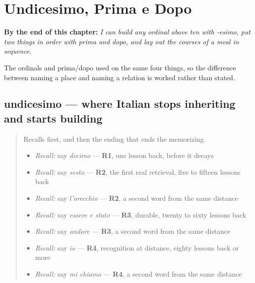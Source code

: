 
\chapter{Undicesimo, Prima e Dopo}
\label{ch:it-ordinali-esimo}

\begin{chapteropening}
\textbf{By the end of this chapter:} \emph{I can build any ordinal above ten with -esimo, put two things in order with prima and dopo, and lay out the courses of a meal in sequence.}

The ordinals and prima/dopo used on the same four things, so the difference between naming a place and naming a relation is worked rather than stated.
\end{chapteropening}

\section[undicesimo]{undicesimo — where Italian stops inheriting and starts building}

\label{lesson:IT-C28-undicesimo}



\begin{quote}
Recalls first, and then the ending that ends the memorizing.

\begin{itemize}
\raggedright
  \item \emph{Recall:} say \emph{decimo} — \textbf{R1}, one lesson back, before it decays
  \item \emph{Recall:} say \emph{sesto} — \textbf{R2}, the first real retrieval, five to fifteen lessons back
  \item \emph{Recall:} say \emph{l'orecchio} — \textbf{R2}, a second word from the same distance
  \item \emph{Recall:} say \emph{essere e stato} — \textbf{R3}, durable, twenty to sixty lessons back
  \item \emph{Recall:} say \emph{andare} — \textbf{R3}, a second word from the same distance
  \item \emph{Recall:} say \emph{io} — \textbf{R4}, recognition at distance, eighty lessons back or more
  \item \emph{Recall:} say \emph{mi chiamo} — \textbf{R4}, a second word from the same distance
\end{itemize}
\end{quote}

